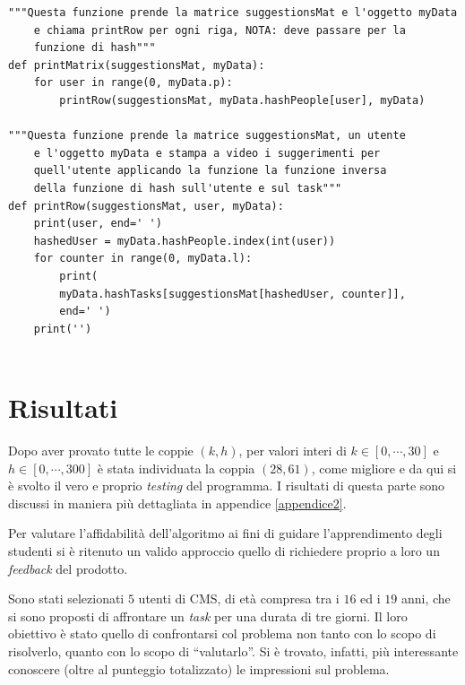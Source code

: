 \documentclass[12pt,a4paper]{article}
\theoremstyle{thm}
\theoremstyle{def}
\begin{document}
\begin{verbatim}
"""Questa funzione prende la matrice suggestionsMat e l'oggetto myData
	e chiama printRow per ogni riga, NOTA: deve passare per la
	funzione di hash"""
def printMatrix(suggestionsMat, myData):
	for user in range(0, myData.p):
		printRow(suggestionsMat, myData.hashPeople[user], myData)

"""Questa funzione prende la matrice suggestionsMat, un utente
	e l'oggetto myData e stampa a video i suggerimenti per
	quell'utente applicando la funzione la funzione inversa
	della funzione di hash sull'utente e sul task"""
def printRow(suggestionsMat, user, myData):
	print(user, end=' ')
	hashedUser = myData.hashPeople.index(int(user))
	for counter in range(0, myData.l):
		print(
		myData.hashTasks[suggestionsMat[hashedUser, counter]],
		end=' ')
	print('')		
	

\end{verbatim}


\section{Risultati}
Dopo aver provato tutte le coppie $(k, h)$, per valori interi di $k \in [0, \cdots, 30]$ e $h \in [0, \cdots, 300]$ è stata individuata la coppia $(28,61)$, come migliore e da qui si è svolto il vero e proprio \textit{testing} del programma. I risultati di questa parte sono discussi in maniera più dettagliata in appendice \ref{appendice2}.

Per valutare l'affidabilità dell'algoritmo ai fini di guidare l'apprendimento degli studenti si è ritenuto un valido approccio quello di richiedere proprio a loro un \textit{feedback} del prodotto.

Sono stati selezionati $5$ utenti di CMS, di età compresa tra i $16$ ed i $19$ anni, che si sono proposti di affrontare un \textit{task} per una durata di tre giorni. Il loro obiettivo è stato quello di confrontarsi col problema non tanto con lo scopo di risolverlo, quanto con lo scopo di ``valutarlo''. Si è trovato, infatti, più interessante conoscere (oltre al punteggio totalizzato) le impressioni sul problema.
\end{document}
